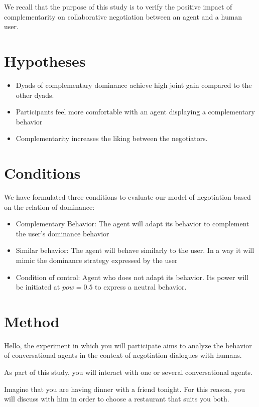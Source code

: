 \documentclass [french]{paper}
\begin{document}
		
		We recall that the purpose of this study is to verify the positive impact of complementarity on collaborative negotiation between an agent and a human user.
	
		
		\section{Hypotheses}
		\begin{itemize}
			\item Dyads of complementary dominance achieve high joint gain  compared to the other dyads.
			\item Participants feel more comfortable with an agent displaying a complementary behavior
			\item Complementarity increases the liking between the negotiators.
		\end{itemize}

			
		\section{Conditions}
			We have formulated three conditions to evaluate our model of negotiation based on the relation of dominance:

			\begin{itemize}
				\item Complementary Behavior: The agent will adapt its behavior to complement the user's dominance behavior
				
				\item Similar behavior: The agent will behave similarly to the user. In a way it will mimic the dominance strategy expressed by the user
				
				\item Condition of control: Agent who does not adapt its behavior. Its power will be initiated at $ pow = 0.5 $ to express a neutral behavior.
			\end{itemize}
			
			
		\section{Method}
			Hello, the experiment in which you will participate aims to analyze the behavior of conversational agents in the context of negotiation dialogues with  humans.
			
			As part of this study, you will interact with one or several conversational agents.
			
			Imagine that you are having dinner with a friend tonight. For this reason, you will discuss with him in order to choose a restaurant that suits you both.
			
\end{document}
